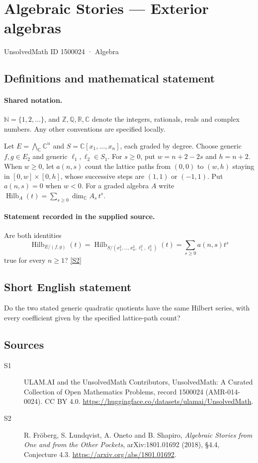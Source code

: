 \documentclass[11pt]{article}
\newcommand{\sref}[2]{\hyperlink{source:#1:#2}{[S#2]}}
\begin{document}
\setcounter{section}{1500023}
\section{Algebraic Stories — Exterior algebras}\label{1500024}
{\small\sffamily UnsolvedMath ID 1500024 · Algebra}
\subsection{Definitions and mathematical statement}

\paragraph{Shared notation.}$\mathbb N=\{1,2,\ldots\}$, and $\mathbb Z,\mathbb Q,\mathbb R,\mathbb C$ denote the integers, rationals, reals and complex numbers. Any other conventions are specified locally.


Let $E=\bigwedge_{\mathbb C}\mathbb C^n$ and $S=\mathbb C[x_1,\ldots,x_n]$, each graded by degree. Choose generic $f,g\in E_2$ and generic $\ell_1,\ell_2\in S_1$. For $s\geq0$, put $w=n+2-2s$ and $h=n+2$. When $w\geq0$, let $a(n,s)$ count the lattice paths from $(0,0)$ to $(w,h)$ staying in $[0,w]\times[0,h]$, whose successive steps are $(1,1)$ or $(-1,1)$. Put $a(n,s)=0$ when $w<0$. For a graded algebra $A$ write $\operatorname{Hilb}_A(t)=\sum_{s\geq0}\dim_{\mathbb C}A_s\,t^s$.
\paragraph{Statement recorded in the supplied source.}
Are both identities
\[\operatorname{Hilb}_{E/(f,g)}(t)=\operatorname{Hilb}_{S/(x_1^2,\ldots,x_n^2,\ell_1^2,\ell_2^2)}(t)=\sum_{s\geq0}a(n,s)t^s
\]
true for every $n\geq1$? \sref{1500024}{2}
\subsection{Short English statement}
Do the two stated generic quadratic quotients have the same Hilbert series, with every coefficient given by the specified lattice-path count?
\subsection{Sources}
\begin{description}
\item[\hypertarget{source:1500024:1}{S1}] ULAM.AI and the UnsolvedMath Contributors, UnsolvedMath: A Curated Collection of Open Mathematics Problems, record 1500024 (AMR-014-0024). CC BY 4.0. \url{https://huggingface.co/datasets/ulamai/UnsolvedMath}.
\item[\hypertarget{source:1500024:2}{S2}] R. Fröberg, S. Lundqvist, A. Oneto and B. Shapiro, \emph{Algebraic Stories from One and from the Other Pockets}, arXiv:1801.01692 (2018), §4.4, Conjecture 4.3. \url{https://arxiv.org/abs/1801.01692}.
\end{description}
\label{end:1500024}
\end{document}
